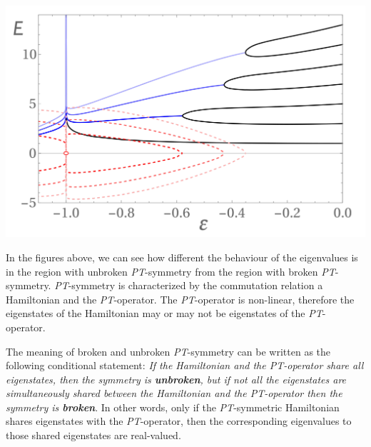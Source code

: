 \documentclass[10pt, a4paper, singlespacing]{report}
\newenvironment{Figure}
    {\par\medskip\noindent\minipage{\linewidth}}
    {\endminipage\par\medskip}
\newcommand\PT{\emph{PT}}
\begin{document}
\begin{Figure}
\centering
\includegraphics[width=0.75\linewidth]{figure_3_Bender_ET_AL.png}
\label{fig:Benders}
\end{Figure}

In the figures above, we can see how different the behaviour of the eigenvalues is in the region with unbroken \PT-symmetry from the region with broken \PT-symmetry.
\PT-symmetry is characterized by the commutation relation a Hamiltonian and the \PT-operator. The \PT-operator is non-linear, therefore the eigenstates of the Hamiltonian may or may not be eigenstates of the \PT-operator. 

The meaning of broken and unbroken \PT-symmetry can be written as the following conditional statement: \emph{If the Hamiltonian and the \PT-operator share all eigenstates, then the symmetry is \textbf{unbroken}, but if not all the eigenstates are simultaneously shared between the Hamiltonian and the \PT-operator then the symmetry is \textbf{broken}}\cite{BenderPT}\cite{Bender}. In other words, only if the \PT-symmetric Hamiltonian shares eigenstates with the \PT-operator, then the corresponding eigenvalues to those shared eigenstates are real-valued.
\end{document}

